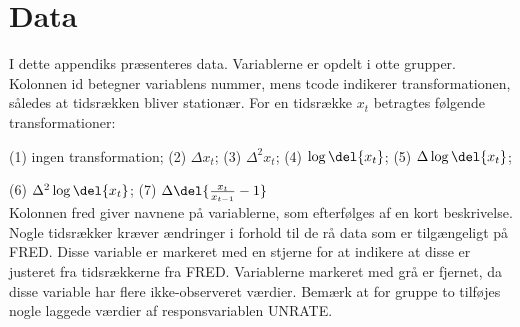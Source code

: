 \chapter{Data} \label{app:app_data}

I dette appendiks præsenteres data. 
Variablerne er opdelt i otte grupper.
Kolonnen id betegner variablens nummer, mens tcode indikerer transformationen, således at tidsrækken bliver stationær. For en tidsrække $x_t$ betragtes følgende transformationer:

(1) ingen transformation; (2) \(\Delta x_t\); (3) \(\Delta^2 x_t\); (4) \(\log \del{x_t}\); (5) \(\Delta \log \del{x_t}\); 

(6) \(\Delta^2 \log \del{x_t}\); (7) \(\Delta \del{\frac{x_t}{x_{t-1}}-1}\) \\[2mm]
%
Kolonnen fred giver navnene på variablerne, som efterfølges af en kort beskrivelse.
Nogle tidsrækker kræver ændringer i forhold til de rå data som er tilgængeligt på FRED.
Disse variable er markeret med en stjerne for at indikere at disse er justeret fra tidsrækkerne fra FRED.
Variablerne markeret med grå er fjernet, da disse variable har flere ikke-observeret værdier.
Bemærk at for gruppe to tilføjes nogle laggede værdier af responsvariablen UNRATE.



%





